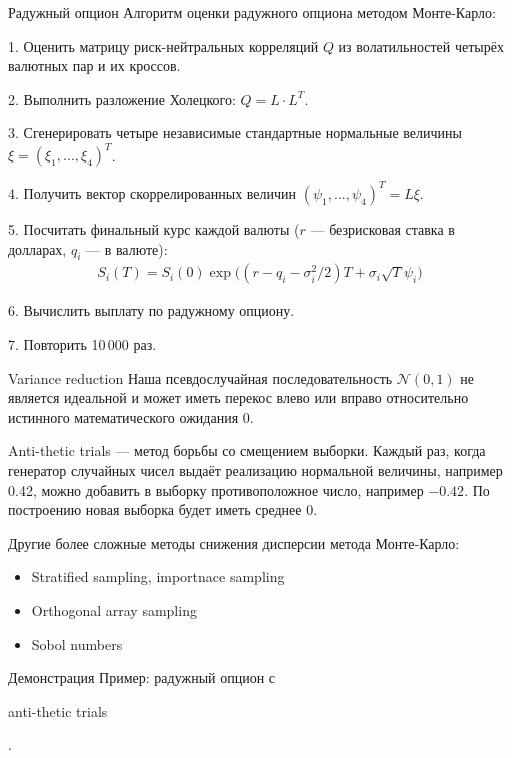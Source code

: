 \documentclass{beamer}
\newcommand{\en}[1]{\begin{otherlanguage}{english}#1\end{otherlanguage}}
\begin{document}
\begin{frame}{Радужный опцион}
\justify
Алгоритм оценки радужного опциона методом Монте-Карло:

1. Оценить матрицу риск-нейтральных корреляций $Q$ из волатильностей четырёх валютных пар и их кроссов.

2. Выполнить разложение Холецкого: $Q = L \cdot L^T$.

3. Сгенерировать четыре независимые стандартные нормальные величины $\xi = (\xi_1,...,\xi_4)^T$.

4. Получить вектор скоррелированных величин $(\psi_1,...,\psi_4)^T = L\xi$.

5. Посчитать финальный курс каждой валюты ($r$ --- безрисковая ставка в долларах, $q_i$ --- в валюте):
\begin{align*}
S_i(T) = S_i(0)\exp\Big(\left(r - q_i - \sigma_i^2/2\right)T + \sigma_i\sqrt{T}\psi_i\Big)
\end{align*}

6. Вычислить выплату по радужному опциону.

7. Повторить 10\,000 раз.
\end{frame}



\begin{frame}{Variance reduction}
\justify
Наша псевдослучайная последовательность $\mathcal{N}(0,1)$ не является идеальной и может иметь перекос влево или вправо относительно истинного математического ожидания 0.

\justify
Anti-thetic trials --- метод борьбы со смещением выборки. Каждый раз, когда генератор случайных чисел выдаёт реализацию нормальной величины, например 0.42, можно добавить в выборку противоположное число, например $-0.42$. По построению новая выборка будет иметь среднее 0.

\justify
Другие более сложные методы снижения дисперсии метода Монте-Карло:
\begin{itemize}
\item Stratified sampling, importnace sampling
\item Orthogonal array sampling
\item Sobol numbers
\end{itemize}
\end{frame}



\begin{frame}{Демонстрация}
\justify
Пример: радужный опцион с \en{anti-thetic trials}.
\end{frame}
\end{document}
